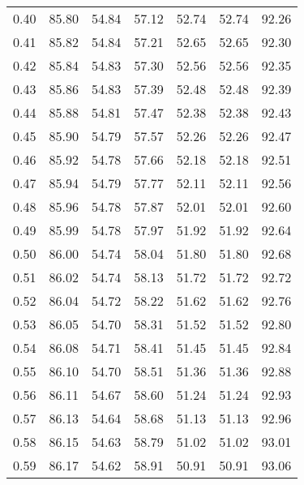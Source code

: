 \begin{tabular}{|c|c|c|c|c|c|c|}
      0.40 &     85.80 &     54.84 &      57.12 &   52.74 &      52.74 &         92.26 \\
      0.41 &     85.82 &     54.84 &      57.21 &   52.65 &      52.65 &         92.30 \\
      0.42 &     85.84 &     54.83 &      57.30 &   52.56 &      52.56 &         92.35 \\
      0.43 &     85.86 &     54.83 &      57.39 &   52.48 &      52.48 &         92.39 \\
      0.44 &     85.88 &     54.81 &      57.47 &   52.38 &      52.38 &         92.43 \\
      0.45 &     85.90 &     54.79 &      57.57 &   52.26 &      52.26 &         92.47 \\
      0.46 &     85.92 &     54.78 &      57.66 &   52.18 &      52.18 &         92.51 \\
      0.47 &     85.94 &     54.79 &      57.77 &   52.11 &      52.11 &         92.56 \\
      0.48 &     85.96 &     54.78 &      57.87 &   52.01 &      52.01 &         92.60 \\
      0.49 &     85.99 &     54.78 &      57.97 &   51.92 &      51.92 &         92.64 \\
      0.50 &     86.00 &     54.74 &      58.04 &   51.80 &      51.80 &         92.68 \\
      0.51 &     86.02 &     54.74 &      58.13 &   51.72 &      51.72 &         92.72 \\
      0.52 &     86.04 &     54.72 &      58.22 &   51.62 &      51.62 &         92.76 \\
      0.53 &     86.05 &     54.70 &      58.31 &   51.52 &      51.52 &         92.80 \\
      0.54 &     86.08 &     54.71 &      58.41 &   51.45 &      51.45 &         92.84 \\
      0.55 &     86.10 &     54.70 &      58.51 &   51.36 &      51.36 &         92.88 \\
      0.56 &     86.11 &     54.67 &      58.60 &   51.24 &      51.24 &         92.93 \\
      0.57 &     86.13 &     54.64 &      58.68 &   51.13 &      51.13 &         92.96 \\
      0.58 &     86.15 &     54.63 &      58.79 &   51.02 &      51.02 &         93.01 \\
      0.59 &     86.17 &     54.62 &      58.91 &   50.91 &      50.91 &         93.06 \\

\end{tabular}
